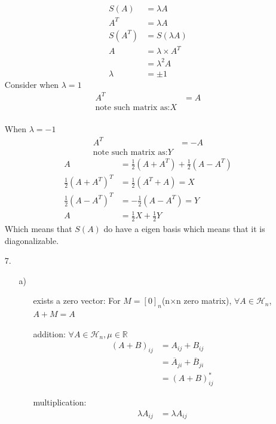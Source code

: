 \documentclass{article}
\begin{document}
\begin{itemize}
\begin{align*}
            S(A)&=\lambda A\\
            A^T&=\lambda A\\
           S(A^T)&=S(\lambda A)\\
           A&=\lambda \times A^T\\
           &=\lambda^2 A\\
           \lambda &=\pm1
        \end{align*}
        Consider when \(\lambda =1\)
        \begin{align*}
            A^T&=A\\
            \text{note such matrix as:} X
        \end{align*}\\
        When \(\lambda =-1\)
        \begin{align*}
            A^T&=-A\\
            \text{note such matrix as:} Y
        \end{align*}
        \begin{align*}
            A&=\frac{1}{2}(A+A^T)+\frac{1}{2}(A-A^T)\\
            \frac{1}{2}(A+A^T)^T&=\frac{1}{2}(A^T+A)=X\\
            \frac{1}{2}(A-A^T)^T&=-\frac{1}{2}(A-A^T)=Y\\
            A&=\frac{1}{2}X+\frac{1}{2}Y
        \end{align*}
        Which means that \(S(A)\) do have a eigen basis which means that it is diagonalizable.
    \item [7.]
    \begin{itemize}
        \item [a)]\
        \begin{itemize}
            \item [exists a zero vector:] For \(M=[0]_n\)(n\(\times\)n zero matrix), \(\forall A\in\mathcal{H}_n\), \(A+M=A\)
            \item [addition:] \(\forall A\in \mathcal{H}_n,\mu \in \mathbb{R}\)
                \begin{align*}
                    (A+B)_{ij}&= A_{ij}+B_{ij}\\
                    &=\overline{A}_{ji}+\overline{B}_{ji}\\
                    &=(A+B)^*_{ij}
                \end{align*}
            \item [multiplication:]
            \begin{align*}
                \lambda A_{ij}&=\lambda A_{ij}\\

\end{align*}
\end{itemize}
\end{itemize}
\end{itemize}
\end{document}
